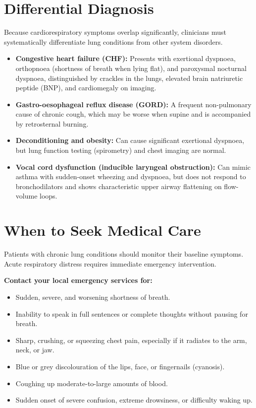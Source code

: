\section*{Differential Diagnosis}
Because cardiorespiratory symptoms overlap significantly, clinicians must systematically differentiate lung conditions from other system disorders.
\begin{itemize}
    \item \textbf{Congestive heart failure (CHF):} Presents with exertional dyspnoea, orthopnoea (shortness of breath when lying flat), and paroxysmal nocturnal dyspnoea, distinguished by crackles in the lungs, elevated brain natriuretic peptide (BNP), and cardiomegaly on imaging.
    \item \textbf{Gastro-oesophageal reflux disease (GORD):} A frequent non-pulmonary cause of chronic cough, which may be worse when supine and is accompanied by retrosternal burning.
    \item \textbf{Deconditioning and obesity:} Can cause significant exertional dyspnoea, but lung function testing (spirometry) and chest imaging are normal.
    \item \textbf{Vocal cord dysfunction (inducible laryngeal obstruction):} Can mimic asthma with sudden-onset wheezing and dyspnoea, but does not respond to bronchodilators and shows characteristic upper airway flattening on flow-volume loops.
\end{itemize}

\section*{When to Seek Medical Care}
Patients with chronic lung conditions should monitor their baseline symptoms. Acute respiratory distress requires immediate emergency intervention.

\textbf{Contact your local emergency services for:}
\begin{itemize}
    \item Sudden, severe, and worsening shortness of breath.
    \item Inability to speak in full sentences or complete thoughts without pausing for breath.
    \item Sharp, crushing, or squeezing chest pain, especially if it radiates to the arm, neck, or jaw.
    \item Blue or grey discolouration of the lips, face, or fingernails (cyanosis).
    \item Coughing up moderate-to-large amounts of blood.
    \item Sudden onset of severe confusion, extreme drowsiness, or difficulty waking up.
\end{itemize}

